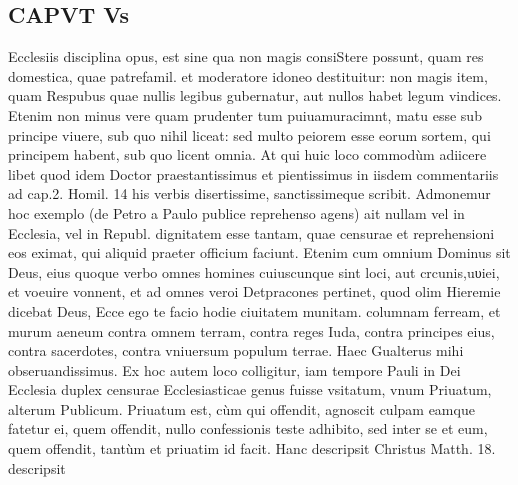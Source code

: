 \documentclass{article}
\begin{document}
\begin{pages}
\section*{CAPVT  Vs }
\marginpar{[ p.319 ]}\pstart Ecclesiis disciplina opus, est sine qua non magis consiStere possunt, quam res domestica, quae patrefamil. et moderatore idoneo destituitur: non magis item, quam Respubus  quae nullis legibus gubernatur, aut nullos habet legum vindices. Etenim non minus vere quam prudenter tum puiuamuracimnt, matu esse sub principe viuere, sub quo nihil liceat: sed multo peiorem esse eorum sortem, qui principem habent, sub quo licent omnia. At qui huic loco commodùm adiicere libet quod idem Doctor praestantissimus et pientissimus in iisdem commentariis ad cap.2. Homil. 14 his verbis disertissime, sanctissimeque scribit. Admonemur hoc exemplo (de Petro a Paulo publice reprehenso agens) ait nullam vel in Ecclesia, vel in Republ. dignitatem esse tantam, quae censurae et reprehensioni eos eximat, qui aliquid praeter officium faciunt. Etenim cum omnium Dominus sit Deus, eius quoque verbo omnes homines cuiuscunque  sint loci, aut crcunis,uυiei, et voeuire vonnent, et ad omnes veroi Detpracones pertinet, quod olim Hieremie dicebat Deus, Ecce ego te facio hodie ciuitatem munitam. columnam ferream, et murum aeneum contra omnem terram, contra reges Iuda, contra principes eius, contra sacerdotes, contra vniuersum populum terrae.  \pend\pstart Haec Gualterus mihi obseruandissimus.  \pend\pstart Ex hoc autem loco colligitur, iam tempore Pauli in Dei Ecclesia duplex censurae Ecclesiasticae genus fuisse vsitatum, vnum Priuatum, alterum Publicum. Priuatum est, cùm qui offendit, agnoscit culpam eamque fatetur ei, quem offendit, nullo confessionis teste adhibito, sed inter se et eum, quem offendit, tantùm et priuatim id facit. Hanc descripsit Christus Matth. 18. descripsit  \pend

\end{pages}
\end{document}
